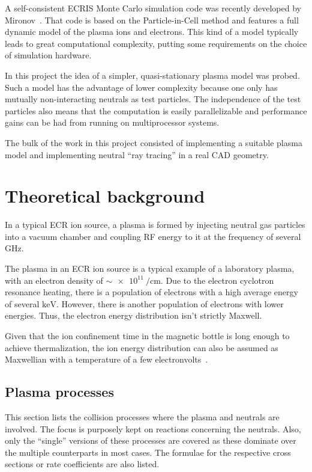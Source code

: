 \documentclass[a4paper,twoside,12pt]{article}
\begin{document}
A self-consistent ECRIS Monte Carlo simulation code was recently developed by
Mi\-ro\-nov~\cite{mironov:ecr}. That code is based on the Particle-in-Cell method
and features a full dynamic model of the plasma ions and electrons. This kind
of a model typically leads
to great computational complexity, putting some requirements on the choice of
simulation hardware.

In this project the idea of a simpler, quasi-stationary plasma model was probed. Such a model has the advantage of lower complexity because one only has mutually non-interacting neutrals as test particles. The independence of the test particles also means that the computation is easily parallelizable and performance gains can be had from running on multiprocessor systems.

The bulk of the work in this project consisted of implementing a suitable plasma model and implementing neutral ``ray tracing'' in a real CAD geometry.

\section{Theoretical background}
In a typical ECR ion source, a plasma is formed by injecting neutral gas particles into a vacuum chamber and coupling RF energy to it at the frequency of several $\si{\giga\hertz}$.

The plasma in an ECR ion source is a typical example of a laboratory plasma, with an electron density of $\sim\SI{e11}{\per\centi\metre}$. Due to the electron cyclotron resonance heating, there is a population of electrons with a high average energy of several $\si{\kilo\electronvolt}$. However, there is another population of electrons with lower energies. Thus, the electron energy distribution isn't strictly Maxwell.~\cite{geller:ecr}

Given that the ion confinement time in the magnetic bottle is long enough to achieve thermalization, the ion energy distribution can also be assumed as Maxwellian with a temperature of a few electronvolts~\cite{geller:ecr}.

\subsection{Plasma processes}
This section lists the collision processes where the plasma and neutrals are
involved. The focus is purposely kept on reactions concerning the neutrals. Also, only the ``single'' versions of these processes are covered as these dominate over the multiple counterparts in most cases. The formulae for the respective cross sections or rate coefficients are also listed.
\end{document}
